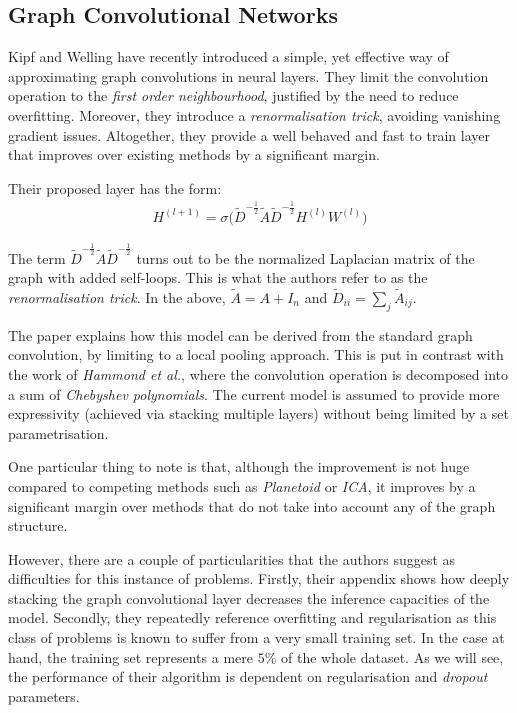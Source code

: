 \documentclass[10pt,a4]{article}
\begin{document}
    \subsection{Graph Convolutional Networks \cite{kipf2016semi}} 

    Kipf and Welling \cite{kipf2016semi} have recently introduced a simple, 
    yet effective way of approximating graph convolutions in neural layers. 
    They limit the convolution operation to the \emph{first order neighbourhood}, 
    justified by the need to reduce overfitting. Moreover, they introduce a 
    \emph{renormalisation trick}, avoiding vanishing gradient issues. 
    Altogether, they provide a well behaved and fast to train layer that improves 
    over existing methods by a significant margin.

    Their proposed layer has the form:
    \begin{align}
        \label{eqn:layer}
        H^{(l+1)} = \sigma \big( 
            \tilde{D}^{-\frac{1}{2}} 
            \tilde{A} 
            \tilde{D}^{-\frac{1}{2}} 
            H^{(l)}W^{(l)}
            \big)
    \end{align}

    The term $\tilde{D}^{-\frac{1}{2}} \tilde{A} \tilde{D}^{-\frac{1}{2}} $ turns out 
    to be the normalized Laplacian matrix \cite{hammond2011wavelets} of the graph 
    with added self-loops. This is what the authors refer to as the 
    \emph{renormalisation trick}. In the above, $\tilde{A} = A + I_n$ and 
    $\tilde{D}_{ii} = \sum_j\tilde{A}_{ij}$.

    The paper explains how this model can be derived from the standard graph convolution, 
    by limiting to a local pooling approach. This is put in 
    contrast with the work of \emph{Hammond et al.}\cite{hammond2011wavelets}, where 
    the convolution operation is decomposed into a sum of \emph{Chebyshev polynomials}.
    The current model is assumed to provide more expressivity (achieved via 
    stacking multiple layers) without being limited by a set parametrisation. 

    One particular thing to note is that, although the improvement is not huge 
    compared to competing methods such as \emph{Planetoid}\cite{yang2016revisiting} 
    or \emph{ICA}\cite{bhagat2011node}, it improves by a significant margin over 
    methods that do not take into account any of the graph structure. 

    However, there are a couple of particularities that the authors suggest as 
    difficulties for this instance of problems. Firstly, their appendix shows how 
    deeply stacking the graph convolutional layer decreases the inference capacities 
    of the model. 
    Secondly, they repeatedly reference overfitting and regularisation as this 
    class of problems is known to suffer from a very small training set. In the 
    case at hand, the training set represents a mere $5\%$ of the whole dataset. 
    As we will see, the performance of their algorithm is dependent on 
    regularisation and \emph{dropout} \cite{srivastava2014dropout} parameters.
\end{document}
